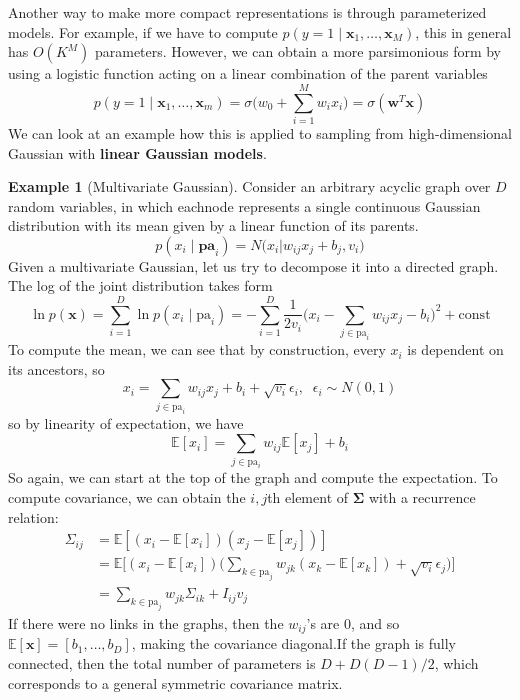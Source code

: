 \documentclass{article}
\theoremstyle{definition}
\newtheorem{example}{Example}[section]
\theoremstyle{remark}
\theoremstyle{definition}
\begin{document}
Another way to make more compact representations is through parameterized models. For example, if we have to compute $p(y = 1 \mid \mathbf{x}_1, \ldots, \mathbf{x}_M)$, this in general has $O(K^M)$ parameters. However, we can obtain a more parsimonious form by using a logistic function acting on a linear combination of the parent variables 
\[p(y = 1 \mid \mathbf{x}_1, \ldots, \mathbf{x}_m) = \sigma \bigg( w_0 + \sum_{i=1}^M w_i x_i \bigg) = \sigma(\mathbf{w}^T \mathbf{x}) \]
We can look at an example how this is applied to sampling from high-dimensional Gaussian with \textbf{linear Gaussian models}.  


\begin{example}[Multivariate Gaussian]
Consider an arbitrary acyclic graph over $D$ random variables, in which eachnode represents a single continuous Gaussian distribution with its mean given by a linear function of its parents. 
\[p(x_i \mid \mathbf{pa}_i) = N \bigg( x_i \bigg| w_{ij} x_j + b_j, v_i \bigg) \]
Given a multivariate Gaussian, let us try to decompose it into a directed graph. The log of the joint distribution takes form 
\[\ln p(\mathbf{x}) = \sum_{i=1}^D \ln p(x_i \mid \mathrm{pa}_i) = - \sum_{i=1}^D \frac{1}{2 v_i} \bigg( x_i - \sum_{j \in \mathrm{pa}_i} w_{ij} x_j - b_i \bigg)^2 + \mathrm{const}\]
To compute the mean, we can see that by construction, every $x_i$ is dependent on its ancestors, so 
\[x_i = \sum_{j \in \mathrm{pa}_i} w_{ij} x_j + b_i + \sqrt{v_i} \epsilon_i, \;\; \epsilon_i \sim N(0, 1)\]
so by linearity of expectation, we have 
\[\mathbb{E}[x_i] = \sum_{j \in \mathrm{pa}_i} w_{ij} \mathbb{E}[x_j] + b_i\]
So again, we can start at the top of the graph and compute the expectation. To compute covariance, we can obtain the $i, j$th element of $\boldsymbol{\Sigma}$ with a recurrence relation: 
\begin{align*} 
    \Sigma_{ij} & = \mathbb{E}[ (x_i - \mathbb{E}[x_i]) (x_j - \mathbb{E}[x_j])] \\
                & = \mathbb{E} \bigg[ (x_i - \mathbb{E}[x_i]) \bigg( \sum_{k \in \mathrm{pa}_j} w_{j k} (x_k - \mathbb{E}[x_k])  + \sqrt{v_i} \epsilon_j\bigg) \bigg] \\
                & = \sum_{k \in \mathrm{pa}_j} w_{j k} \Sigma_{ik} + I_{ij} v_j
\end{align*}
If there were no links in the graphs, then the $w_{ij}$'s are $0$, and so $\mathbb{E}[\mathbf{x}] = [b_1, \ldots, b_D]$, making the covariance diagonal.If the graph is fully connected, then the total number of parameters is $D + D(D-1)/2$, which corresponds to a general symmetric covariance matrix.  
\end{example}
\end{document}
